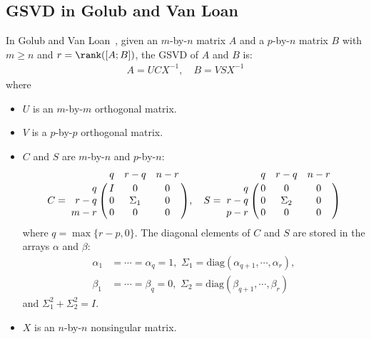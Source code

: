 \subsection{GSVD in Golub and Van Loan}
In Golub and Van Loan~\cite[pp.~309]{golub2013matrix}, 
given an $m$-by-$n$ matrix $A$ and a $p$-by-$n$ matrix $B$ with 
$m \ge n$ and $r = \rank([A; B])$, the GSVD of $A$ and $B$ is:
\begin{align} \label{eq:gsvdbyvanloan} 
A = UCX^{-1}, \quad B = VSX^{-1}  
\end{align}
where
\begin{itemize}
\item $U$ is an $m$-by-$m$ orthogonal matrix.

\item $V$ is a $p$-by-$p$ orthogonal matrix.

\item $C$ and $S$ are $m$-by-$n$ and $p$-by-$n$: 
\[
            C = \bordermatrix{ & q & r-q & n-r  \cr
            \hfill q & I & 0 & 0\cr
            \hfill r-q & 0 & \Sigma_1 & 0\cr
            \hfill m-r & 0 & 0 & 0}, \quad
            S = \bordermatrix{ & q & r-q & n-r \cr
            \hfill q & 0 & 0 & 0\cr
            \hfill r-q & 0 & \Sigma_2 & 0\cr
            \hfill p-r & 0 & 0 & 0}
\]
where $q = \max\{r-p, 0\}$. 
The diagonal elements of $C$ and $S$ are stored in the arrays
$\alpha$ and $\beta$: 
\begin{align*} 
\alpha_1 & = \cdots = \alpha_q = 1,\,\, 
\Sigma_1 = \mbox{diag}(\alpha_{q+1}, \cdots, \alpha_r), \\
\beta_1 & = \cdots = \beta_q = 0, \,\, 
\Sigma_2 = \mbox{diag}(\beta_{q+1}, \cdots, \beta_r)
\end{align*}
and $\Sigma_1^2 + \Sigma_2^2 = I$.

\item $X$ is an $n$-by-$n$ nonsingular matrix. 
\end{itemize}

